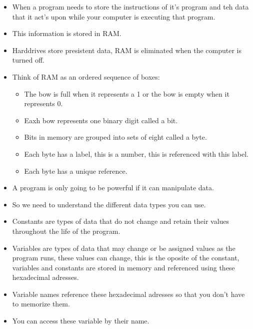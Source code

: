 \begin{itemize}
    \item When a program needs to store the instructions of it's program and teh data that it act's upon while your computer is executing that program.
    \item This information is stored in RAM.
    \item Harddrives store presistent data, RAM is eliminated when the computer is turned off.
    \item Think of RAM as an ordered sequence of boxes:
        \begin{itemize}
            \item The bow is full when it represents a 1 or the bow is empty when it represents 0.
            \item Eaxh bow represents one binary digit called a bit.
            \item Bits in memory are grouped into sets of eight called a byte.
            \item Each byte has a label, this is a number, this is referenced with this label.
            \item Each byte has a unique reference.
        \end{itemize}
    
    \item A program is only going to be powerful if it can manipulate data.
    \item So we need to understand the different data types you can use.
    \item Constants are types of data that do not change and retain their values throughout the life of the program.
    \item Variables are types of data that may change or be assigned values as the program runs, these values can change, this is the oposite of the constant, variables and constants are stored in memory and referenced using these hexadecimal adresses.
    \item Variable names reference these hexadecimal adresses so that you don't have to memorize them.
    \item You can access these variable by their name.
\end{itemize}
